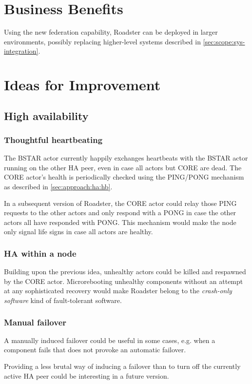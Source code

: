 \section{Business Benefits}
Using the new federation capability, Roadster can be deployed in larger
environments, possibly replacing higher-level systems described in
\autoref{sec:scope:sys-integration}.

\section{Ideas for Improvement}
\subsection{High availability}
\subsubsection{Thoughtful heartbeating}\label{sec:discussion:imp:ha:hb}
The BSTAR actor currently happily exchanges heartbeats with the BSTAR actor
running on the other HA peer, even in case all actors but CORE are dead. The
CORE actor's health is periodically checked using the PING/PONG mechanism as
described in \autoref{sec:approach:ha:hb}.

In a subsequent version of Roadster, the CORE actor could relay those PING
requests to the other actors and only respond with a PONG in case the other
actors all have responded with PONG. This mechanism would make the node only
signal life signs in case all actors are healthy.

\subsubsection{HA within a node}
Building upon the previous idea, unhealthy actors could be killed and respawned
by the CORE actor.  Microrebooting unhealthy components without an attempt at
any sophisticated recovery would make Roadster belong to the \emph{crash-only
software} kind of fault-tolerant software.

\subsubsection{Manual failover}\label{sec:discussion:ha:manual-failover}
A manually induced failover could be useful in some cases, e.g. when a
component fails that does not provoke an automatic failover.

Providing a less brutal way of inducing a failover than to turn off the
currently active HA peer could be interesting in a future version.

